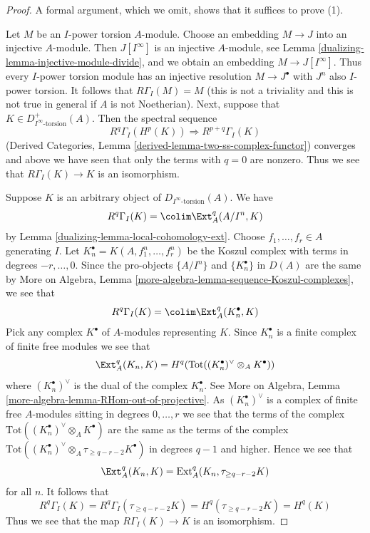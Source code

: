\begin{proof}

A formal argument, which we omit, shows that it suffices to prove (1).

\medskip\noindent
Let $M$ be an $I$-power torsion $A$-module. Choose an embedding
$M \to J$ into an injective $A$-module. Then $J[I^\infty]$ is
an injective $A$-module, see Lemma \ref{dualizing-lemma-injective-module-divide},
and we obtain an embedding $M \to J[I^\infty]$.
Thus every $I$-power torsion module has an injective resolution
$M \to J^\bullet$ with $J^n$ also $I$-power torsion. It follows
that $R\Gamma_I(M) = M$ (this is not a triviality and this is not
true in general if $A$ is not Noetherian). Next, suppose that
$K \in D_{I^\infty\text{-torsion}}^+(A)$. Then the spectral sequence
$$
R^q\Gamma_I(H^p(K)) \Rightarrow R^{p + q}\Gamma_I(K)
$$
(Derived Categories, Lemma \ref{derived-lemma-two-ss-complex-functor})
converges and above we have seen that only the terms with $q = 0$
are nonzero. Thus we see that $R\Gamma_I(K) \to K$ is an isomorphism.

\medskip\noindent
Suppose $K$ is an arbitrary object of $D_{I^\infty\text{-torsion}}(A)$.
We have
$$
R^q\Gamma_I(K) = \colim \Ext^q_A(A/I^n, K)
$$
by Lemma \ref{dualizing-lemma-local-cohomology-ext}. Choose $f_1, \ldots, f_r \in A$
generating $I$. Let $K_n^\bullet = K(A, f_1^n, \ldots, f_r^n)$ be the
Koszul complex with terms in degrees $-r, \ldots, 0$. Since the
pro-objects $\{A/I^n\}$ and $\{K_n^\bullet\}$ in $D(A)$ are the same by
More on Algebra, Lemma \ref{more-algebra-lemma-sequence-Koszul-complexes},
we see that
$$
R^q\Gamma_I(K) = \colim \Ext^q_A(K_n^\bullet, K)
$$
Pick any complex $K^\bullet$ of $A$-modules representing $K$.
Since $K_n^\bullet$ is a finite complex of finite free modules we see
that
$$
\Ext^q_A(K_n, K) =
H^q(\text{Tot}((K_n^\bullet)^\vee \otimes_A K^\bullet))
$$
where $(K_n^\bullet)^\vee$ is the dual of the complex $K_n^\bullet$.
See More on Algebra, Lemma \ref{more-algebra-lemma-RHom-out-of-projective}.
As $(K_n^\bullet)^\vee$ is a complex of finite free $A$-modules sitting
in degrees $0, \ldots, r$ we see that the terms of the complex
$\text{Tot}((K_n^\bullet)^\vee \otimes_A K^\bullet)$ are the
same as the terms of the complex
$\text{Tot}((K_n^\bullet)^\vee \otimes_A \tau_{\geq q - r - 2} K^\bullet)$
in degrees $q - 1$ and higher. Hence we see that
$$
\Ext^q_A(K_n, K) = \text{Ext}^q_A(K_n, \tau_{\geq q - r - 2}K)
$$
for all $n$. It follows that
$$
R^q\Gamma_I(K) = R^q\Gamma_I(\tau_{\geq q - r - 2}K) =
H^q(\tau_{\geq q - r - 2}K) = H^q(K)
$$
Thus we see that the map $R\Gamma_I(K) \to K$ is an isomorphism.
\end{proof}

